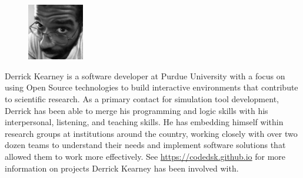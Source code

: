\documentclass[letterpaper]{article}
\begin{document}
\begin{figure}
  \vspace{-10pt}
  \begin{center}
    \includegraphics[width=0.22\textwidth]{images/avatar_2inX2in.jpeg}
  \end{center}
  \vspace{-20pt}
\end{figure}

\noindent
Derrick Kearney is a software developer at Purdue University with a focus on
using Open Source technologies to build interactive environments that
contribute to scientific research. As a primary contact for simulation tool
development, Derrick has been able to merge his programming and logic skills
with his interpersonal, listening, and teaching skills. He has embedding
himself within research groups at institutions around the country, working
closely with over two dozen teams to understand their needs and implement
software solutions that allowed them to work more effectively. See
\url{https://codedsk.github.io} for more information on projects Derrick Kearney has
been involved with.

\end{document}
